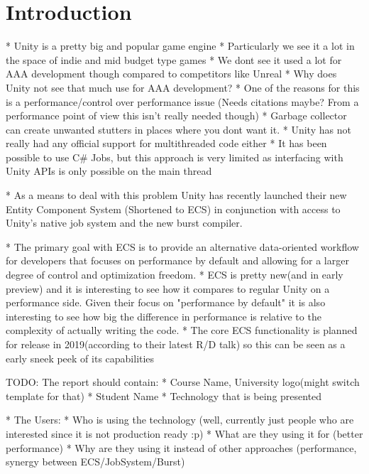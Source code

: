 \section{Introduction}
* Unity is a pretty big and popular game engine
* Particularly we see it a lot in the space of indie and mid budget type games
* We dont see it used a lot for AAA development though compared to competitors like Unreal 
* Why does Unity not see that much use for AAA development?
   * One of the reasons for this is a performance/control over performance issue (Needs citations maybe? From a performance point of view this isn't really needed though)
      * Garbage collector can create unwanted stutters in places where you dont want it.
      * Unity has not really had any official support for multithreaded code either
         * It has been possible to use C\# Jobs, but this approach is very limited as interfacing with Unity APIs is only possible on the main thread

* As a means to deal with this problem Unity has recently launched their new Entity Component System (Shortened to ECS) in conjunction with access to Unity's native job system and the new burst compiler. 
   
* The primary goal with ECS is to provide an alternative data-oriented workflow for developers that focuses on performance by default and allowing for a larger degree of control and optimization freedom.
* ECS is pretty new(and in early preview) and it is interesting to see how it compares to regular Unity on a performance side. Given their focus on "performance by default" it is also interesting to see how big the difference in performance is relative to the complexity of actually writing the code.
* The core ECS functionality is planned for release in 2019(according to their latest R/D talk) so this can be seen as a early sneek peek of its capabilities

TODO: 
The report should contain:
* Course Name, University logo(might switch template for that)
* Student Name
* Technology that is being presented


* The Users:
  * Who is using the technology (well, currently just people who are interested since it is not production ready :p)
  * What are they using it for (better performance)
  * Why are they using it instead of other approaches (performance, synergy between ECS/JobSystem/Burst)
